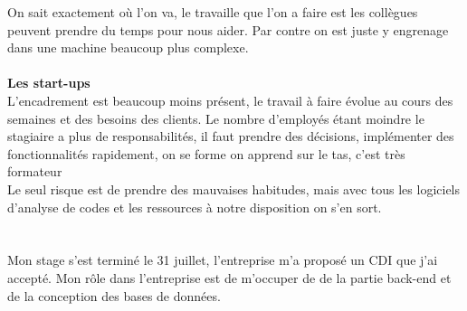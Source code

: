 On sait exactement où l'on va, le travaille que l'on a faire est les collègues peuvent prendre du temps pour nous aider. Par contre on est juste y engrenage dans une machine beaucoup plus complexe.
\\ \\
\textbf{Les start-ups}
\\
L'encadrement est beaucoup moins présent, le travail à faire évolue au cours des semaines et des besoins des clients. Le nombre d'employés étant moindre le stagiaire a plus de responsabilités, il faut prendre des décisions, implémenter des fonctionnalités rapidement, on se forme on apprend sur le tas, c'est très formateur \\
Le seul risque est de prendre des mauvaises habitudes, mais avec tous les logiciels d'analyse de codes et les ressources à notre disposition on s'en sort.
\\
\\
\\

Mon stage s'est terminé le 31 juillet, l'entreprise m'a proposé un CDI que j'ai accepté. Mon rôle dans l'entreprise est de m'occuper de de la partie back-end et de la conception des bases de données.   

 